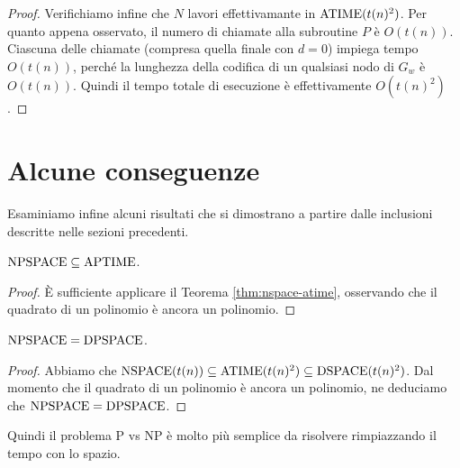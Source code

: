 \begin{proof}
  Verifichiamo infine che $N$ lavori effettivamante in $\operatorname{ATIME}(t(n)^2)$.
  Per quanto appena osservato, il numero di chiamate alla subroutine $P$ è $O(t(n))$.
  Ciascuna delle chiamate (compresa quella finale con $d=0$) impiega tempo $O(t(n))$, perché la lunghezza della codifica di un qualsiasi nodo di $G_w$ è $O(t(n))$.
  Quindi il tempo totale di esecuzione è effettivamente $O(t(n)^2)$.
\end{proof}


\section{Alcune conseguenze}

Esaminiamo infine alcuni risultati che si dimostrano a partire dalle inclusioni descritte nelle sezioni precedenti.

\begin{corollario}
  $\operatorname{NPSPACE} \subseteq \operatorname{APTIME}$.
\end{corollario}

\begin{proof}
  È sufficiente applicare il Teorema \ref{thm:nspace-atime}, osservando che il quadrato di un polinomio è ancora un polinomio.
\end{proof}


\begin{corollario}
  \label{cor:npspace-dpspace}
  $\operatorname{NPSPACE} = \operatorname{DPSPACE}$.
\end{corollario}

\begin{proof}
  Abbiamo che $\operatorname{NSPACE}(t(n))\subseteq \operatorname{ATIME}(t(n)^2) \subseteq \operatorname{DSPACE}(t(n)^2)$.
  Dal momento che il quadrato di un polinomio è ancora un polinomio, ne deduciamo che $\operatorname{NPSPACE} = \operatorname{DPSPACE}$.
\end{proof}

Quindi il problema P vs NP è molto più semplice da risolvere rimpiazzando il tempo con lo spazio.


